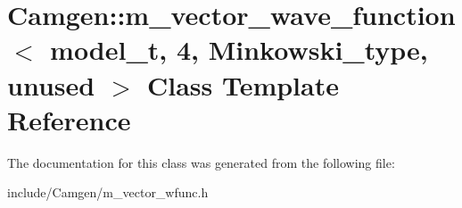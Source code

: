 \hypertarget{a00335}{\section{Camgen\-:\-:m\-\_\-vector\-\_\-wave\-\_\-function$<$ model\-\_\-t, 4, Minkowski\-\_\-type, unused $>$ Class Template Reference}
\label{a00335}
}


The documentation for this class was generated from the following file\-:\begin{DoxyCompactItemize}
\item 
include/\-Camgen/m\-\_\-vector\-\_\-wfunc.\-h\end{DoxyCompactItemize}
